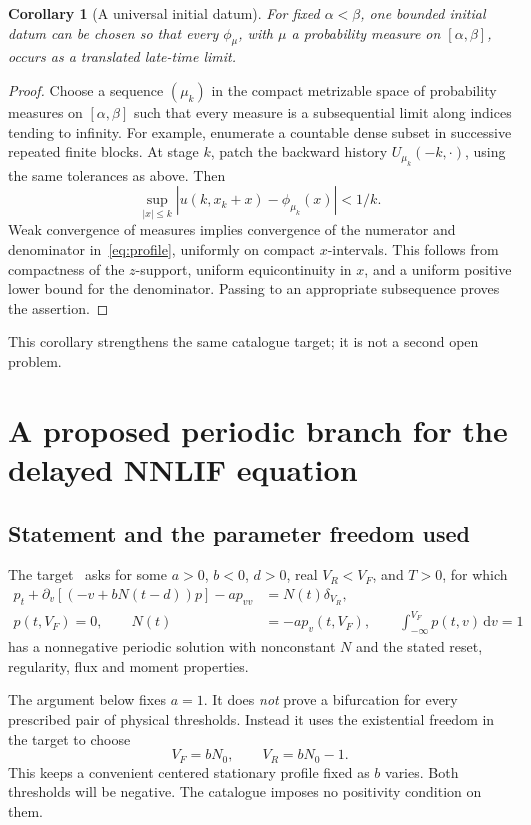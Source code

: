 \documentclass[11pt,a4paper]{article}
\numberwithin{equation}{section}
\newtheorem{corollary}[theorem]{Corollary}
\theoremstyle{remark}\newtheorem{remark}[theorem]{Remark}
\newcommand{\dd}{\,\mathrm d}
\begin{document}
\begin{corollary}[A universal initial datum]\label{cor:universal}
For fixed $\alpha<\beta$, one bounded initial datum can be chosen so that every $\phi_\mu$, with $\mu$ a probability measure on $[\alpha,\beta]$, occurs as a translated late-time limit.
\end{corollary}
\begin{proof}
Choose a sequence $(\mu_k)$ in the compact metrizable space of probability measures on $[\alpha,\beta]$ such that every measure is a subsequential limit along indices tending to infinity. For example, enumerate a countable dense subset in successive repeated finite blocks. At stage $k$, patch the backward history $U_{\mu_k}(-k,\cdot)$, using the same tolerances as above. Then
\[
 \sup_{|x|\leq k}|u(k,x_k+x)-\phi_{\mu_k}(x)|<1/k.
\]
Weak convergence of measures implies convergence of the numerator and denominator in~\eqref{eq:profile}, uniformly on compact $x$-intervals. This follows from compactness of the $z$-support, uniform equicontinuity in $x$, and a uniform positive lower bound for the denominator. Passing to an appropriate subsequence proves the assertion.
\end{proof}
This corollary strengthens the same catalogue target; it is not a second open problem.

\newpage
\section{A proposed periodic branch for the delayed NNLIF equation}\label{sec:nnlif}

\subsection{Statement and the parameter freedom used}
The target~\cite{nnlifentry} asks for some $a>0$, $b<0$, $d>0$, real $V_R<V_F$, and $T>0$, for which
\begin{align}
 p_t+\partial_v[(-v+bN(t-d))p]-a p_{vv}&=N(t)\delta_{V_R},\label{eq:physical}\\
 p(t,V_F)=0,\qquad N(t)&=-a p_v(t,V_F),\qquad
 \int_{-\infty}^{V_F}p(t,v)\dd v=1\label{eq:physical-bc}
\end{align}
has a nonnegative periodic solution with nonconstant $N$ and the stated reset, regularity, flux and moment properties.

The argument below fixes $a=1$. It does \emph{not} prove a bifurcation for every prescribed pair of physical thresholds. Instead it uses the existential freedom in the target to choose
\begin{equation}\label{eq:threshold-family}
 V_F=bN_0,\qquad V_R=bN_0-1.
\end{equation}
This keeps a convenient centered stationary profile fixed as $b$ varies. Both thresholds will be negative. The catalogue imposes no positivity condition on them.
\end{document}
